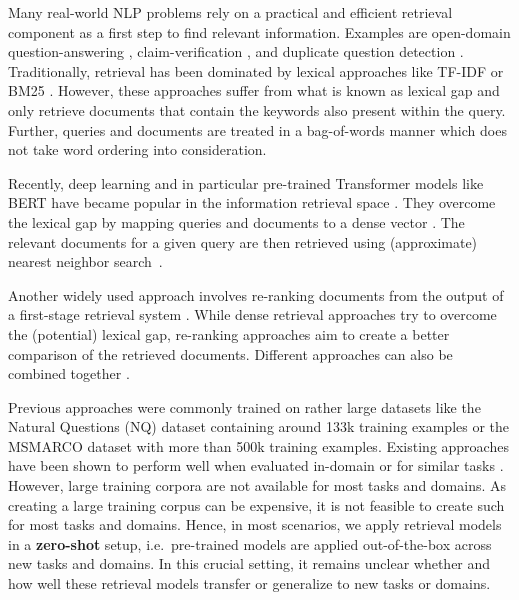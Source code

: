 \documentclass[11pt]{article}
\begin{document}
Many real-world NLP problems rely on a practical and efficient retrieval component as a first step to find relevant information. Examples are open-domain question-answering \cite{chen-etal-2017-reading}, claim-verification \cite{thorne-etal-2018-fever}, and duplicate question detection \cite{zhang2015multi}. Traditionally, retrieval has been dominated by lexical approaches like TF-IDF or BM25 \cite{bm25}. However, these approaches suffer from what is known as lexical gap \cite{berger2000bridging} and only retrieve documents that contain the keywords also present within the query. Further, queries and documents are treated in a bag-of-words manner which does not take word ordering into consideration.

Recently, deep learning and in particular pre-trained Transformer models like BERT \cite{devlin2018bert} have became popular in the information retrieval space \cite{lin2020pretrained}. They overcome the lexical gap by mapping queries and documents to a dense vector \cite{10.1145/2983323.2983769, lee-etal-2019-latent, karpukhin-etal-2020-dense, guu2020realm, gao2020complementing, liang2020embeddingbased, ma2021zeroshot}. The relevant documents for a given query are then retrieved using (approximate) nearest neighbor search~\cite{JDH17}.

Another widely used approach involves re-ranking documents from the output of a first-stage retrieval system \cite{nogueira2019multistage, nogueira-etal-2020-document, nogueira2020passage, 10.1145/3397271.3401075}. While dense retrieval approaches try to overcome the (potential) lexical gap, re-ranking approaches aim to create a better comparison of the retrieved documents. Different approaches can also be combined together \cite{ding2020rocketqa, gao2020complementing, luan2021sparse}.

Previous approaches were commonly trained on rather large datasets like the Natural Questions (NQ) dataset \cite{47761} containing around 133k training examples or the MSMARCO dataset \cite{nguyen2016ms} with more than 500k training examples. Existing approaches have been shown to perform well when evaluated in-domain or for similar tasks \cite{nogueira2020passage, karpukhin-etal-2020-dense, ding2020rocketqa}. However, large training corpora are not available for most tasks and domains. As creating a large training corpus can be expensive, it is not feasible to create such for most tasks and domains. Hence, in most scenarios, we apply retrieval models in a \textbf{zero-shot} setup, i.e.\ pre-trained models are applied out-of-the-box across new tasks and domains. In this crucial setting, it remains unclear whether and how well these retrieval models transfer or generalize to new tasks or domains. 
\end{document}
